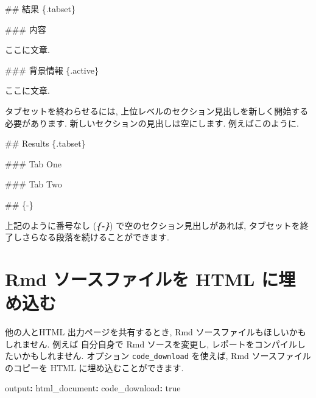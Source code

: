 \documentclass[
  11pt,
  lualatex,
  ja=standard]{bxjsreport}
\newenvironment{Shaded}{\begin{snugshade}}{\end{snugshade}}
\newcommand{\AttributeTok}[1]{\textcolor[rgb]{0.77,0.63,0.00}{#1}}
\newcommand{\CharTok}[1]{\textcolor[rgb]{0.31,0.60,0.02}{#1}}
\newcommand{\FunctionTok}[1]{\textcolor[rgb]{0.00,0.00,0.00}{#1}}
\newcommand{\InformationTok}[1]{\textcolor[rgb]{0.56,0.35,0.01}{\textbf{\textit{#1}}}}
\newcommand{\KeywordTok}[1]{\textcolor[rgb]{0.13,0.29,0.53}{\textbf{#1}}}
\newcommand{\NormalTok}[1]{#1}
\begin{document}
\begin{Shaded}
\begin{Highlighting}[]
\FunctionTok{\#\# 結果 \{.tabset\}}

\FunctionTok{\#\#\# 内容}

\NormalTok{ここに文章.}

\FunctionTok{\#\#\# 背景情報 \{.active\}}

\NormalTok{ここに文章.}
\end{Highlighting}
\end{Shaded}

タブセットを終わらせるには, 上位レベルのセクション見出しを新しく開始する必要があります. 新しいセクションの見出しは空にします. 例えばこのように.

\begin{Shaded}
\begin{Highlighting}[]
\FunctionTok{\#\# Results \{.tabset\}}

\FunctionTok{\#\#\# Tab One}

\FunctionTok{\#\#\# Tab Two}

\FunctionTok{\#\# \{{-}\}}

\NormalTok{上記のように番号なし (}\InformationTok{\textasciigrave{}\{{-}\}\textasciigrave{}}\NormalTok{) で空のセクション見出しがあれば,}
\NormalTok{タブセットを終了しさらなる段落を続けることができます.}
\end{Highlighting}
\end{Shaded}

\hypertarget{embed-rmd}{%
\section{Rmd ソースファイルを HTML に埋め込む}\label{embed-rmd}}

他の人とHTML 出力ページを共有するとき, Rmd ソースファイルもほしいかもしれません. 例えば 自分自身で Rmd ソースを変更し, レポートをコンパイルしたいかもしれません. オプション \texttt{code\_download} を使えば, Rmd ソースファイルのコピーを HTML に埋め込むことができます.

\begin{Shaded}
\begin{Highlighting}[]
\FunctionTok{output}\KeywordTok{:}
\AttributeTok{  }\FunctionTok{html\_document}\KeywordTok{:}
\AttributeTok{    }\FunctionTok{code\_download}\KeywordTok{:}\AttributeTok{ }\CharTok{true}
\end{Highlighting}
\end{Shaded}
\end{document}
